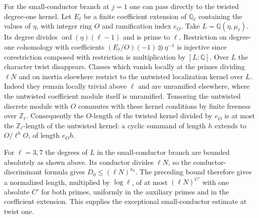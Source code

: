 \documentclass[11pt]{amsart}
\theoremstyle{definition}
\theoremstyle{remark}
\begin{document}
For the small-conductor branch at $j=1$ one can pass directly to the
twisted degree-one kernel. Let $E_\ell$ be a finite coefficient
extension of $\mathbb Q_\ell$ containing the values of $\eta$, with
integer ring $O$ and ramification index $e_O$. Take
$L=\mathbb Q(\eta,\mu_\ell)$. Its degree divides
$\operatorname{ord}(\eta)(\ell-1)$ and is prime to $\ell$.
Restriction on degree-one cohomology with coefficients
$(E_\ell/O)(-1)\otimes\eta^{-1}$ is injective since corestriction
composed with restriction is multiplication by $[L:\mathbb Q]$.
Over $L$ the character twist disappears. Classes which vanish locally
at the primes dividing $\ell N$ and on inertia elsewhere restrict
to the untwisted localization kernel over $L$. Indeed they remain
locally trivial above $\ell$ and are unramified elsewhere, where the
untwisted coefficient module itself is unramified. Tensoring the
untwisted discrete module with $O$ commutes with these kernel
conditions by finite freeness over $\mathbb Z_\ell$. Consequently the
$O$-length of the twisted kernel divided by $e_O$ is at most the
$\mathbb Z_\ell$-length of the untwisted kernel: a cyclic summand of
length $h$ extends to $O/\ell^h O$, of length $e_O h$.

For $\ell=3,7$ the degrees of $L$ in the small-conductor branch are
bounded absolutely as shown above. Its conductor divides $\ell N$,
so the conductor-discriminant formula gives $D_0\le(\ell N)^{n_0}$.
The preceding bound therefore gives a normalized length, multiplied
by $\log\ell$, of at most $(\ell N)^{C'}$ with one absolute $C'$
for both primes, uniformly in the auxiliary primes and in the
coefficient extension. This supplies the exceptional small-conductor
estimate at twist one.
\end{document}
